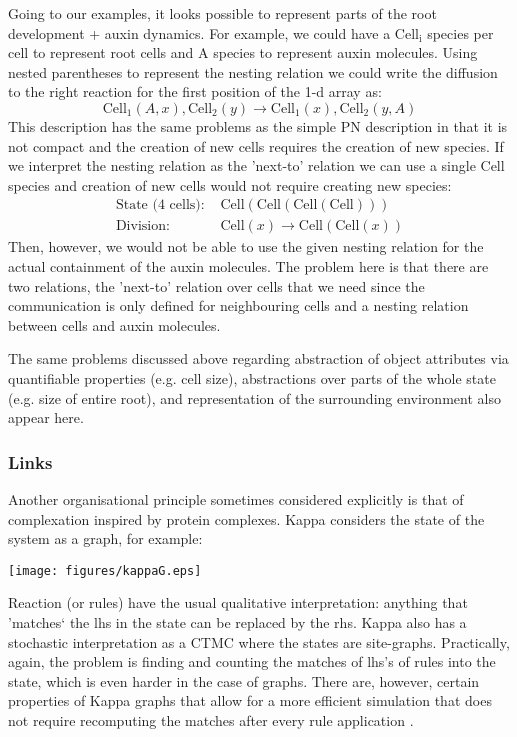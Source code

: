 \documentclass[phd]{infthesis}
\newcommand{\eg}{e.g.\xspace}
\begin{document}
Going to our examples, it looks possible to represent parts of the root
development + auxin dynamics. For example, we could have a $\mathrm{Cell_i}$
species per cell to represent root cells and $\mathrm{A}$ species to represent auxin
molecules. Using nested parentheses to represent the nesting relation we could
write the diffusion to the right reaction for the first position of the 1-d
array as:
$$
\mathrm{Cell_1}(A, x), \mathrm{Cell_2}(y) \rightarrow \mathrm{Cell_1}(x), \mathrm{Cell_2}(y, A)
$$
This description has the same problems as the simple PN description in that it is
not compact and the creation of new cells requires the creation of new
species. If we interpret the nesting relation as the 'next-to' relation we
can use a single $\mathrm{Cell}$ species and creation of new cells would not
require creating new species:
\begin{align*}
  \text{State (4 cells): } & \mathrm{Cell(Cell(Cell(Cell)))} \\
  \text{Division: } & \mathrm{Cell}(x) \rightarrow \mathrm{Cell}(\mathrm{Cell}(x))                                                                                                                                                     
\end{align*}
Then, however, we would not be able to use the given nesting relation for the
actual containment of the auxin molecules. The problem here is that there are
two relations, the 'next-to' relation over cells that we need since the
communication is only defined for neighbouring cells and a nesting relation
between cells and auxin molecules.

The same problems discussed above regarding abstraction of object attributes via
quantifiable properties (\eg cell size), abstractions over parts of the whole
state (\eg size of entire root), and representation of the surrounding
environment also appear here.

\subsubsection*{Links}
Another organisational principle sometimes considered explicitly is that of
complexation inspired by protein complexes. Kappa \citep{danos_formal_2004}
considers the state of the system as a graph, for example:
\begin{center}
    \texttt{[image: figures/kappaG.eps]}
  \end{center}
Reaction (or rules) have the usual qualitative interpretation: anything that
'matches` the lhs in the state can be replaced by the rhs. Kappa
also has a stochastic interpretation as a CTMC where the states are
site-graphs. Practically, again, the problem is finding and counting the matches
of lhs's of rules into the state, which is even harder in the case of
graphs. There are, however, certain properties of Kappa graphs that
allow for a more efficient simulation that does not require recomputing the
matches after every rule application \citep{danos_scalable_2007}.
  
\end{document}
